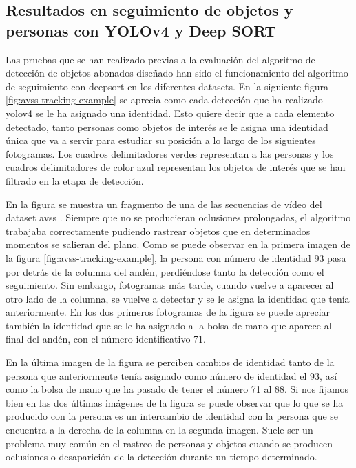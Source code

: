 \subsection{Resultados en seguimiento de objetos y personas con YOLOv4 y Deep SORT}
\label{subsec:resultados-yolov4+deepsort}

Las pruebas que se han realizado previas a la evaluación del algoritmo de detección de objetos abonados diseñado han sido el funcionamiento del algoritmo de seguimiento con \gls{deepsort} en los diferentes datasets. En la siguiente figura \ref{fig:avss-tracking-example} se aprecia como cada detección que ha realizado \gls{yolov4} se le ha asignado una identidad. Esto quiere decir que a cada elemento detectado, tanto personas como objetos de interés se le asigna una identidad única que va a servir para estudiar su posición a lo largo de los siguientes fotogramas. Los cuadros delimitadores verdes representan a las personas y los cuadros delimitadores de color azul representan los objetos de interés que se han filtrado en la etapa de detección.

En la figura se muestra un fragmento de una de las secuencias de vídeo del dataset \gls{avss} \cite{AVSSAB2007-dataset}. Siempre que no se producieran oclusiones prolongadas, el algoritmo trabajaba correctamente pudiendo rastrear objetos que en determinados momentos se salieran del plano. Como se puede observar en la primera imagen de la figura \ref{fig:avss-tracking-example}, la persona con número de identidad 93 pasa por detrás de la columna del andén, perdiéndose tanto la detección como el seguimiento. Sin embargo, fotogramas más tarde, cuando vuelve a aparecer al otro lado de la columna, se vuelve a detectar y se le asigna la identidad que tenía anteriormente. En los dos primeros fotogramas de la figura se puede apreciar también la identidad que se le ha asignado a la bolsa de mano que aparece al final del andén, con el número identificativo 71.

En la última imagen de la figura se perciben cambios de identidad tanto de la persona que anteriormente tenía asignado como número de identidad el 93, así como la bolsa de mano que ha pasado de tener el número 71 al 88. Si nos fijamos bien en las dos últimas imágenes de la figura se puede observar que lo que se ha producido con la persona es un intercambio de identidad con la persona que se encuentra a la derecha de la columna en la segunda imagen. Suele ser un problema muy común en el rastreo de personas y objetos cuando se producen oclusiones o desaparición de la detección durante un tiempo determinado.

